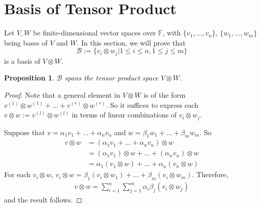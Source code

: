 \documentclass[12pt]{amsbook}
\newtheorem{proposition}[theorem]{Proposition}
\begin{document}
\section{Basis of Tensor Product}
Let $V, W$ be finite-dimensional vector spaces over $\mathbb{F}$, with 
$\{v_1, \dots , v_n\}$, $\{w_1, \dots , w_m\}$ being bases of $V$ and $W$. In this section, we will prove that 
$$\mathcal{B} := \{v_i \otimes w_j | 1 \leq  i \leq  n, 1 \leq  j \leq  m\}$$
is a basis of $V \otimes W$.
\begin{proposition} $\mathcal{B}$ spans the tensor product space $V \otimes W$.
\end{proposition}
\begin{proof}
Note that a general element in $V \otimes W$ is of the form $v^{(1)} \otimes w^{(1)} + \dots + v^{(r)} \otimes w^{(r)}$. So it suffices to express each $v \otimes w := v^{(l)} \otimes w^{(l)}$ in terms of linear combinations of $v_i \otimes w_j$.

Suppose that $v = \alpha_1v_1 + \dots + \alpha_nv_n$ and $w = \beta_1w_1 + \dots + \beta_mw_m$. So
\begin{align*}
v \otimes w &= (\alpha_1v_1 + \dots + \alpha_nv_n) \otimes w \\
&= (\alpha_1v_1) \otimes w + \dots + (\alpha_nv_n) \otimes w \\
&= \alpha_1(v_1 \otimes w) + \dots + \alpha_n(v_n \otimes w) 
\end{align*}
For each $v_i \otimes w$, $v_i \otimes w = \beta_1(v_i \otimes w_1) + \dots + \beta_m(v_i \otimes w_m)$. Therefore,
\begin{align*}
v \otimes w =
\sum_{i=1}^n \sum^m_{j=1} \alpha_i \beta_j (v_i \otimes w_j)
\end{align*}
and the result follows.
\end{proof}
\end{document}
